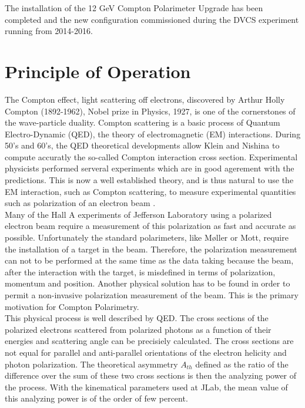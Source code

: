 {The installation of the 12 GeV Compton Polarimeter Upgrade has been completed and the new configuration commissioned during the DVCS experiment running from 2014-2016.


\section {Principle of Operation}
\label{sec:compton_principle}
The Compton effect, light scattering
off electrons, discovered by Arthur Holly Compton (1892-1962), Nobel
prize in Physics, 1927, is one of the cornerstones of the wave-particle
duality. Compton scattering is a basic process of Quantum Electro-Dynamic (QED),
the theory of electromagnetic (EM) interactions.
During 50's and 60's, the QED theoretical developments allow Klein and Nishina to compute accuratly
the so-called Compton interaction cross section. Experimental physicists performed serveral experiments which
are in good agerement with the predictions. This is now a well established
theory, and is thus natural to use the EM interaction, such as Compton
scattering, to measure experimental quantities such as  polarization of an electron beam .
\\

Many of the Hall A experiments of Jefferson Laboratory using a polarized electron beam require a
measurement of this polarization as fast and accurate as possible. Unfortunately the standard
polarimeters, like M{\o}ller or Mott,
require the installation of a target in the beam. Therefore, the polarization
measurement can not to be performed at the same time as the data taking because the beam, after the
interaction with the target, is misdefined in terms of polarization, momentum and position. Another
physical solution has to be found  in order to permit a non-invasive polarization measurement of the
beam. This is the primary motivation for Compton Polarimetry.
\\

This physical process 
is well described by QED. The cross sections of the polarized
electrons scattered from  polarized photons as a function of their energies and scattering angle
can be precisiely calculated.
The cross sections are  not equal for parallel and anti-parallel orientations  of
the electron helicity and photon polarization.
The theoretical  asymmetry $A_{th}$ defined as
the ratio of the difference
over the sum of these two cross sections is then the analyzing power of the process.
With the kinematical parameters used at JLab, the mean value of this analyzing power
is of the order of few percent.
\\

}
